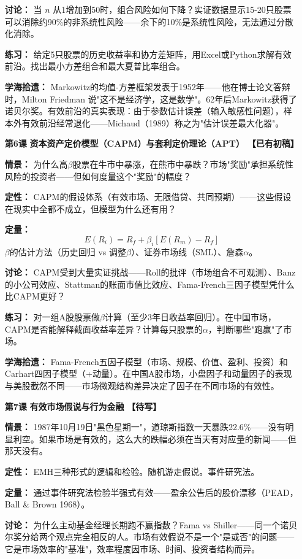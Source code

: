 \documentclass[a4paper,11pt]{ctexart}
\newcommand{\done}{\textcolor{green!50!black}{\textbf{【已有初稿】}}}
\newcommand{\draft}{\textcolor{orange!80!black}{\textbf{【待写】}}}
\begin{document}
\begin{enumerate}
\textbf{讨论：} 当 $n$ 从1增加到50时，组合风险如何下降？实证数据显示15-20只股票可以消除约90\%的非系统性风险——余下的10\%是系统性风险，无法通过分散化消除。

\textbf{练习：} 给定5只股票的历史收益率和协方差矩阵，用Excel或Python求解有效前沿。找出最小方差组合和最大夏普比率组合。

\textbf{学海拾遗：} Markowitz的均值-方差框架发表于1952年——他在博士论文答辩时，Milton Friedman 说"这不是经济学，这是数学"。62年后Markowitz获得了诺贝尔奖。有效前沿的真实表现：由于参数估计误差（输入敏感性问题），样本外有效前沿经常退化——Michaud（1989）称之为"估计误差最大化器"。

\item[\textbf{第6课}] \textbf{资本资产定价模型（CAPM）与套利定价理论（APT）} \done

\textbf{情景：} 为什么高$\beta$股票在牛市中暴涨，在熊市中暴跌？市场"奖励"承担系统性风险的投资者——但如何度量这个"奖励"的幅度？

\textbf{定性：} CAPM的假设体系（有效市场、无限借贷、共同预期）——这些假设在现实中全都不成立，但模型为什么还有用？

\textbf{定量：} 
\[
E(R_i) = R_f + \beta_i [E(R_m) - R_f]
\]
$\beta$的估计方法（历史回归 vs 调整$\beta$）、证券市场线（SML）、詹森$\alpha$。

\textbf{讨论：} CAPM受到大量实证挑战——Roll的批评（市场组合不可观测）、Banz的小公司效应、Stattman的账面市值比效应、Fama-French三因子模型凭什么比CAPM更好？

\textbf{练习：} 对一组A股股票做$\beta$计算（至少3年日收益率回归）。在中国市场，CAPM是否能解释截面收益率差异？计算每只股票的$\alpha$，判断哪些"跑赢"了市场。

\textbf{学海拾遗：} Fama-French五因子模型（市场、规模、价值、盈利、投资）和Carhart四因子模型（+动量）。在中国A股市场，小盘因子和动量因子的表现与美股截然不同——市场微观结构差异决定了因子在不同市场的有效性。

\item[\textbf{第7课}] \textbf{有效市场假说与行为金融} \draft

\textbf{情景：} 1987年10月19日"黑色星期一"，道琼斯指数一天暴跌22.6\%——没有明显利空。如果市场是有效的，这么大的跌幅必须在当天有对应量的新闻——但那天没有。

\textbf{定性：} EMH三种形式的逻辑和检验。随机游走假说。事件研究法。

\textbf{定量：} 通过事件研究法检验半强式有效——盈余公告后的股价漂移（PEAD，Ball \& Brown 1968）。

\textbf{讨论：} 为什么主动基金经理长期跑不赢指数？Fama vs Shiller——同一个诺贝尔奖分给两个观点完全相反的人。市场有效假说不是一个"是或否"的问题——它是市场效率的"基准"，效率程度因市场、时间、投资者结构而异。


\end{enumerate}
\end{document}
